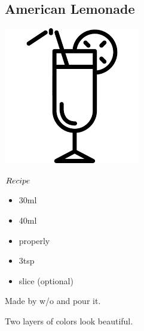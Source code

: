 \subsection{American Lemonade}
\vspace{-7.6mm}
\hspace{54mm}
\includegraphics[scale=.07]{cocktail_glass_tall.png}
\vspace{2.5mm}
\begin{itembox}[l]{\boldmath $Recipe$}
\begin{itemize}
\setlength{\parskip}{0cm}
\setlength{\itemsep}{0cm}
\item \rw 30ml
\item \lj 40ml
\item \mw properly
\item \gumsyrup 3tsp
\item \lemon slice (optional)
\end{itemize}
\vspace{-4mm}
Made by \build w/o \rw
\hspace{-1mm} and pour it.
\end{itembox}
Two layers of colors look beautiful. 
